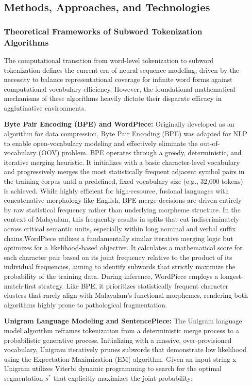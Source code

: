 \documentclass[12pt]{article}
\begin{document}
	\subsection{Methods, Approaches, and Technologies }
	\subsubsection{Theoretical Frameworks of Subword Tokenization Algorithms }
	
	The computational transition from word-level tokenization to subword tokenization defines the current era of neural sequence modeling, driven by the necessity to balance representational coverage for infinite word forms against computational vocabulary efficiency. However, the foundational mathematical mechanisms of these algorithms heavily dictate their disparate efficacy in agglutinative environments. 
	
	\textbf{Byte Pair Encoding (BPE) and WordPiece:}\cite{} Originally developed as an algorithm for data compression, Byte Pair Encoding (BPE) was adapted for NLP to enable open-vocabulary modeling and effectively eliminate the out-of-vocabulary (OOV) problem. BPE operates through a greedy, deterministic, and iterative merging heuristic. It initializes with a basic character-level vocabulary and progressively merges the most statistically frequent adjacent symbol pairs in the training corpus until a predefined, fixed vocabulary size (e.g., 32,000 tokens) is achieved. While highly efficient for high-resource, fusional languages with concatenative morphology like English, BPE merge decisions are driven entirely by raw statistical frequency rather than underlying morpheme structure. In the context of Malayalam, this frequently results in splits that cut indiscriminately across critical semantic units, especially within long nominal and verbal suffix chains.WordPiece utilizes a fundamentally similar iterative merging logic but optimizes for a likelihood-based objective. It calculates a mathematical score for each character pair based on its joint frequency relative to the product of its individual frequencies, aiming to identify subwords that strictly maximize the probability of the training data. During inference, WordPiece employs a longest-match-first strategy. Like BPE, it prioritizes statistically frequent character clusters that rarely align with Malayalam's functional morphemes, rendering both algorithms highly prone to pathological fragmentation. 
	
	\textbf{Unigram Language Modeling and SentencePiece:}\cite{} The Unigram language model algorithm reframes tokenization from a deterministic merge process to a probabilistic generative process. Initializing with a massive, over-provisioned vocabulary, Unigram iteratively prunes subwords that demonstrate low likelihood using the Expectation-Maximization (EM) algorithm. Given an input string x Unigram utilizes Viterbi dynamic programming to search for the optimal segmentation $s^*$ that explicitly maximizes the joint probability:
	
\end{document}
